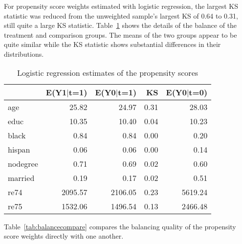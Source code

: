 \documentclass{article}
\begin{document}
For propensity score weights estimated with logistic regression, the largest KS
statistic was reduced from the unweighted sample's largest KS of
0.64 to
0.31, still quite a large KS
statistic. Table~\ref{tab:balancelogit} shows the details of the balance of the
treatment and comparison groups. The means of the two groups appear to be quite
similar while the KS statistic shows substantial differences in their
distributions.

\begin{Schunk}
% latex table generated in R 2.2.1 by xtable 1.3-1 package
% Wed Apr 12 20:51:43 2006
\begin{table}[ht]
\begin{center}
\begin{tabular}{lrrrr}
\hline
 & E(Y1$|$t=1) & E(Y0$|$t=1) & KS & E(Y0$|$t=0) \\
\hline
age & 25.82 & 24.97 & 0.31 & 28.03 \\
educ & 10.35 & 10.40 & 0.04 & 10.23 \\
black & 0.84 & 0.84 & 0.00 & 0.20 \\
hispan & 0.06 & 0.06 & 0.00 & 0.14 \\
nodegree & 0.71 & 0.69 & 0.02 & 0.60 \\
married & 0.19 & 0.17 & 0.02 & 0.51 \\
re74 & 2095.57 & 2106.05 & 0.23 & 5619.24 \\
re75 & 1532.06 & 1496.54 & 0.13 & 2466.48 \\
\hline
\end{tabular}
\caption{Logistic regression estimates of the propensity scores}
\label{tab:balancelogit}
\end{center}
\end{table}\end{Schunk}

Table~\ref{tab:balancecompare} compares the balancing quality of the propensity
score weights directly with one another.
\end{document}
